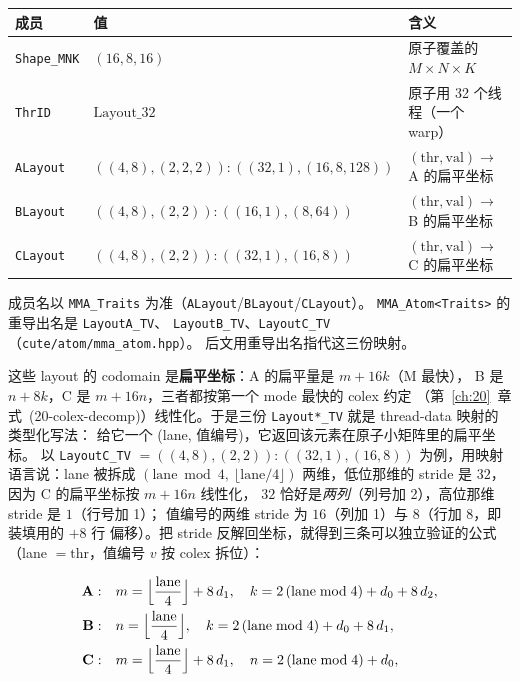 \begin{center}
\footnotesize
\begin{tabular}{@{}lll@{}}
  \toprule
  成员 & 值 & 含义 \\
  \midrule
  \texttt{Shape\_MNK} & $(16,8,16)$ & 原子覆盖的 $M\times N\times K$ \\
  \texttt{ThrID} & $\mathrm{Layout}\_32$ & 原子用 32 个线程（一个 warp） \\
  \texttt{ALayout} & $((4,8),(2,2,2)){:}((32,1),(16,8,128))$ & $(\mathrm{thr},\mathrm{val})\to$ A 的扁平坐标 \\
  \texttt{BLayout} & $((4,8),(2,2)){:}((16,1),(8,64))$ & $(\mathrm{thr},\mathrm{val})\to$ B 的扁平坐标 \\
  \texttt{CLayout} & $((4,8),(2,2)){:}((32,1),(16,8))$ & $(\mathrm{thr},\mathrm{val})\to$ C 的扁平坐标 \\
  \bottomrule
\end{tabular}
\end{center}

成员名以 \texttt{MMA\_Traits} 为准（\texttt{ALayout}/\texttt{BLayout}/\texttt{CLayout}）。
\texttt{MMA\_Atom<Traits>} 的重导出名是 \texttt{LayoutA\_TV}、
\texttt{LayoutB\_TV}、\texttt{LayoutC\_TV}（\texttt{cute/atom/mma\_atom.hpp}）。
后文用重导出名指代这三份映射。

这些 layout 的 codomain 是\textbf{扁平坐标}：A 的扁平量是 $m + 16k$（M 最快），
B 是 $n + 8k$，C 是 $m + 16n$，三者都按第一个 mode 最快的 colex 约定
（第~\ref{ch:20}~章式~(20-colex-decomp)）线性化。于是三份
\texttt{Layout*\_TV} 就是 thread-data 映射的类型化写法：
给它一个 (lane, 值编号)，它返回该元素在原子小矩阵里的扁平坐标。
以 \texttt{LayoutC\_TV} $=((4,8),(2,2)){:}((32,1),(16,8))$ 为例，用映射
语言说：lane 被拆成 $(\mathrm{lane}\bmod4,\ \lfloor\mathrm{lane}/4\rfloor)$
两维，低位那维的 stride 是 $32$，因为 C 的扁平坐标按 $m+16n$ 线性化，
$32$ 恰好是\emph{两列}（列号加 2），高位那维 stride 是 $1$（行号加 1）；
值编号的两维 stride 为 $16$（列加 1）与 $8$（行加 8，即装填用的 $+8$ 行
偏移）。把 stride 反解回坐标，就得到三条可以独立验证的公式
（lane $=\mathrm{thr}$，值编号 $v$ 按 colex 拆位）：

\begin{align}
  \textbf{A}:\quad &m = \Bigl\lfloor\frac{\mathrm{lane}}{4}\Bigr\rfloor + 8\,d_1,
  \quad k = 2\,(\mathrm{lane}\bmod 4) + d_0 + 8\,d_2, \label{eq:22-atom-a}\\
  \textbf{B}:\quad &n = \Bigl\lfloor\frac{\mathrm{lane}}{4}\Bigr\rfloor,
  \quad k = 2\,(\mathrm{lane}\bmod 4) + d_0 + 8\,d_1, \label{eq:22-atom-b}\\
  \textbf{C}:\quad &m = \Bigl\lfloor\frac{\mathrm{lane}}{4}\Bigr\rfloor + 8\,d_1,
  \quad n = 2\,(\mathrm{lane}\bmod 4) + d_0, \label{eq:22-atom-c}
\end{align}

